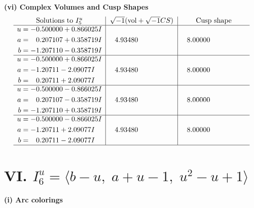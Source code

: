 \documentclass[1p]{elsarticle_modified}
\theoremstyle{definition}
\newcommand{\I}{\sqrt{-1}}
\begin{document}
\newpage\flushleft \textbf{(vi) Complex Volumes and Cusp Shapes}
$$\begin{array}{c|c|c}  
\text{Solutions to }I^u_{5}& \I (\text{vol} + \sqrt{-1}CS) & \text{Cusp shape}\\
 \hline 
\begin{aligned}
u &= -0.500000 + 0.866025 I \\
a &= \phantom{-}0.207107 + 0.358719 I \\
b &= -1.207110 - 0.358719 I\end{aligned}
 & \phantom{-}4.93480\phantom{ +0.000000I} & \phantom{-}8.00000\phantom{ +0.000000I} \\ \hline\begin{aligned}
u &= -0.500000 + 0.866025 I \\
a &= -1.20711 - 2.09077 I \\
b &= \phantom{-}0.20711 + 2.09077 I\end{aligned}
 & \phantom{-}4.93480\phantom{ +0.000000I} & \phantom{-}8.00000\phantom{ +0.000000I} \\ \hline\begin{aligned}
u &= -0.500000 - 0.866025 I \\
a &= \phantom{-}0.207107 - 0.358719 I \\
b &= -1.207110 + 0.358719 I\end{aligned}
 & \phantom{-}4.93480\phantom{ +0.000000I} & \phantom{-}8.00000\phantom{ +0.000000I} \\ \hline\begin{aligned}
u &= -0.500000 - 0.866025 I \\
a &= -1.20711 + 2.09077 I \\
b &= \phantom{-}0.20711 - 2.09077 I\end{aligned}
 & \phantom{-}4.93480\phantom{ +0.000000I} & \phantom{-}8.00000\phantom{ +0.000000I}\\
 \hline 
 \end{array}$$\newpage\newpage\renewcommand{\arraystretch}{1}
\centering \section*{VI. $I^u_{6}= \langle b- u,\;a+u-1,\;u^2- u+1 \rangle$}
\flushleft \textbf{(i) Arc colorings}\\
\end{document}
